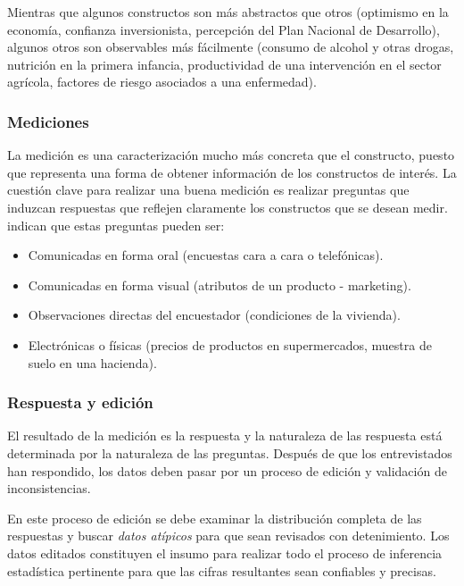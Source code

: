 \documentclass[
  10pt,
  spanish,
]{book}
\providecommand{\tightlist}{%
  \setlength{\itemsep}{0pt}\setlength{\parskip}{0pt}}
\begin{document}
Mientras que algunos constructos son más abstractos que otros (optimismo en la economía, confianza inversionista, percepción del Plan Nacional de Desarrollo), algunos otros son observables más fácilmente (consumo de alcohol y otras drogas, nutrición en la primera infancia, productividad de una intervención en el sector agrícola, factores de riesgo asociados a una enfermedad).

\hypertarget{mediciones}{%
\subsubsection*{Mediciones}\label{mediciones}}

La medición es una caracterización mucho más concreta que el constructo, puesto que representa una forma de obtener información de los constructos de interés. La cuestión clave para realizar una buena medición es realizar preguntas que induzcan respuestas que reflejen claramente los constructos que se desean medir. \citet{Groves_Fowler_Couper_Lepkowski_Singer_Tourangeau_2009} indican que estas preguntas pueden ser:

\begin{itemize}
\tightlist
\item
  Comunicadas en forma oral (encuestas cara a cara o telefónicas).
\item
  Comunicadas en forma visual (atributos de un producto - marketing).
\item
  Observaciones directas del encuestador (condiciones de la vivienda).
\item
  Electrónicas o físicas (precios de productos en supermercados, muestra de suelo en una hacienda).
\end{itemize}

\hypertarget{respuesta-y-ediciuxf3n}{%
\subsubsection*{Respuesta y edición}\label{respuesta-y-ediciuxf3n}}

El resultado de la medición es la respuesta y la naturaleza de las respuesta está determinada por la naturaleza de las preguntas. Después de que los entrevistados han respondido, los datos deben pasar por un proceso de edición y validación de inconsistencias.

En este proceso de edición se debe examinar la distribución completa de las respuestas y buscar \emph{datos atípicos} para que sean revisados con detenimiento. Los datos editados constituyen el insumo para realizar todo el proceso de inferencia estadística pertinente para que las cifras resultantes sean confiables y precisas.
\end{document}
